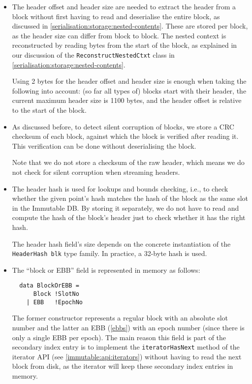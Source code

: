 \begin{itemize}
\item The header offset and header size are needed to extract the header from a
  block without first having to read and deserialise the entire block, as
  discussed in \cref{serialisation:storage:nested-contents}. These are stored
  per block, as the header size can differ from block to block. The nested
  context is reconstructed by reading bytes from the start of the block, as
  explained in our discussion of the \lstinline!ReconstructNestedCtxt! class in
  \cref{serialisation:storage:nested-contents}.

  Using 2 bytes for the header offset and header size is enough when taking the
  following into account: (so far all types of) blocks start with their header,
  the current maximum header size is \num{1100} bytes, and the header offset is
  relative to the start of the block.

\item As discussed before, to detect silent corruption of blocks, we store a CRC
  checksum of each block, against which the block is verified after reading it.
  This verification can be done without deserialising the block.

  Note that we do not store a checksum of the raw header, which means we do not
  check for silent corruption when streaming headers.

\item The header hash is used for lookups and bounds checking, i.e., to check
  whether the given point's hash matches the hash of the block as the same slot
  in the Immutable DB. By storing it separately, we do not have to read and
  compute the hash of the block's header just to check whether it has the right
  hash.

  The header hash field's size depends on the concrete instantiation of the
  \lstinline!HeaderHash blk! type family. In practice, a 32-byte hash is used.

\item The ``block or EBB'' field is represented in memory as follows:

  \begin{lstlisting}
  data BlockOrEBB =
      Block !SlotNo
    | EBB   !EpochNo
  \end{lstlisting}

  The former constructor represents a regular block with an absolute slot number
  and the latter an EBB (\cref{ebbs}) with an epoch number (since there is only
  a single EBB per epoch). The main reason this field is part of the secondary
  index entry is to implement the \lstinline!iteratorHasNext! method of the
  iterator API (see \cref{immutable:api:iterators}) without having to read the
  next block from disk, as the iterator will keep these secondary index entries
  in memory.


\end{itemize}
